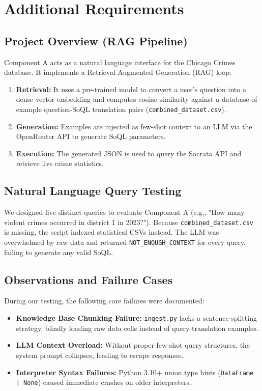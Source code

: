 \documentclass[12pt]{article}
\begin{document}
\section{Additional Requirements}

\subsection{Project Overview (RAG Pipeline)}
Component A acts as a natural language interface for the Chicago Crimes database. It implements a Retrieval-Augmented Generation (RAG) loop:
\begin{enumerate}
    \item \textbf{Retrieval:} It uses a pre-trained model to convert a user's question into a dense vector embedding and computes cosine similarity against a database of example question-SoQL translation pairs (\texttt{combined\_dataset.csv}).
    \item \textbf{Generation:} Examples are injected as few-shot context to an LLM via the OpenRouter API to generate SoQL parameters.
    \item \textbf{Execution:} The generated JSON is used to query the Socrata API and retrieve live crime statistics.
\end{enumerate}

\subsection{Natural Language Query Testing}
We designed five distinct queries to evaluate Component A (e.g., "How many violent crimes occurred in district 1 in 2023?"). Because \texttt{combined\_dataset.csv} is missing, the script indexed statistical CSVs instead. The LLM was overwhelmed by raw data and returned \texttt{NOT\_ENOUGH\_CONTEXT} for every query, failing to generate any valid SoQL.

\subsection{Observations and Failure Cases}
During our testing, the following core failures were documented:
\begin{itemize}
    \item \textbf{Knowledge Base Chunking Failure:} \texttt{ingest.py} lacks a sentence-splitting strategy, blindly loading raw data cells instead of query-translation examples.
    \item \textbf{LLM Context Overload:} Without proper few-shot query structures, the system prompt collapses, leading to escape responses.
    \item \textbf{Interpreter Syntax Failures:} Python 3.10+ union type hints (\texttt{DataFrame | None}) caused immediate crashes on older interpreters.
\end{itemize}
\end{document}
